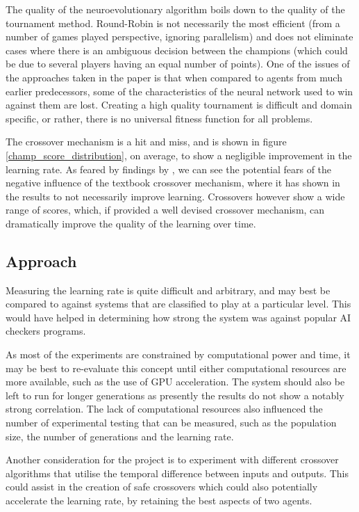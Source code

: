\documentclass[12pt,a4paper]{article}
\begin{document}
    The quality of the neuroevolutionary algorithm boils down to the quality of the tournament method. Round-Robin is not necessarily the most efficient (from a number of games played perspective, ignoring  parallelism) and does not eliminate cases where there is an ambiguous decision between the champions (which could be due to several players having an equal number of points). One of the issues of the approaches taken in the paper is that when compared to agents from much earlier predecessors, some of the characteristics of the neural network used to win against them are lost. Creating a high quality tournament is difficult and domain specific, or rather, there is no universal fitness function for all problems.
   
    The crossover mechanism is a hit and miss, and is shown in figure \ref{champ_score_distribution}, on average, to show a negligible improvement in the learning rate. As feared by findings by \cite{emmanouilidis_comparison_2000}, we can see the potential fears of the negative influence of the textbook crossover mechanism, where it has shown in the results to not necessarily improve learning. Crossovers however show a wide range of scores, which, if provided a well devised crossover mechanism, can dramatically improve the quality of the learning over time.

    \subsection{Approach}
        Measuring the learning rate is quite difficult and arbitrary, and may best be compared to against systems that are classified to play at a particular level. This would have helped in determining how strong the system was against popular AI checkers programs. 

        As most of the experiments are constrained by computational power and time, it may be best to re-evaluate this concept until either computational resources are more available, such as the use of GPU acceleration. The system should also be left to run for longer generations as presently the results do not show a notably strong correlation. The lack of computational resources also influenced the number of experimental testing that can be measured, such as the population size, the number of generations and the learning rate. 
        
        Another consideration for the project is to experiment with different crossover algorithms that utilise the temporal difference between inputs and outputs. This could assist in the creation of safe crossovers which could also potentially accelerate the learning rate, by retaining the best aspects of two agents.
        
\end{document}
